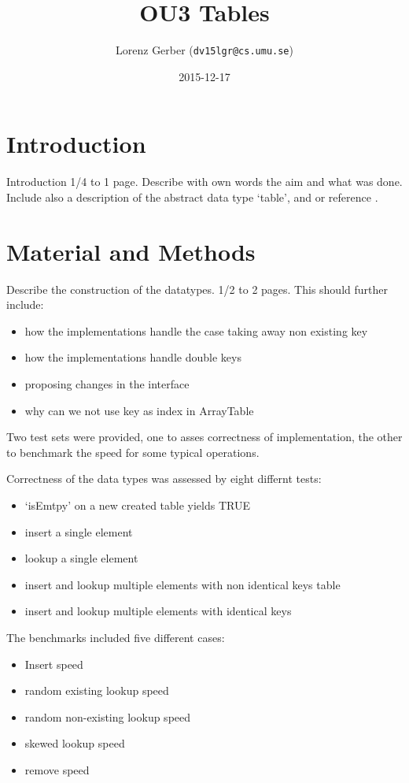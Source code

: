 \documentclass[a4paper,11pt,twoside]{article}
\title{OU3 Tables}
\author{Lorenz Gerber  ({\tt{dv15lgr@cs.umu.se}})}
\date{2015-12-17}
\begin{document}
\maketitle

\tableofcontents
\newpage

\section{Introduction} 
Introduction 1/4 to 1 page. Describe with own words the aim and what
was done. Include also a description of the abstract data type
`table', and or reference \cite[po. 117 -- 132]{janlert2000}.

\section{Material and Methods} 
Describe the construction of the datatypes. 1/2 to 2 pages. This
should further include:
\begin{itemize}
\item how the implementations handle the case taking away non existing
  key
\item how the implementations handle double keys
\item proposing changes in the interface
\item why can we not use key as index in ArrayTable
\end{itemize}

Two test sets were provided, one to asses correctness of
implementation, the other to benchmark the speed for some typical
operations. 

Correctness of the data types was assessed by eight
differnt tests: 
\begin{itemize}
\item `isEmtpy' on a new created table yields TRUE
\item insert a single element
\item lookup a single element
\item insert and lookup multiple elements with non identical keys
table
\item insert and lookup multiple elements with identical keys
\end{itemize}

The benchmarks included five different cases: 
\begin{itemize}
\item Insert speed
\item random existing lookup speed
\item random non-existing lookup speed 
\item skewed lookup speed
\item remove speed  
\end{itemize}
\end{document}

